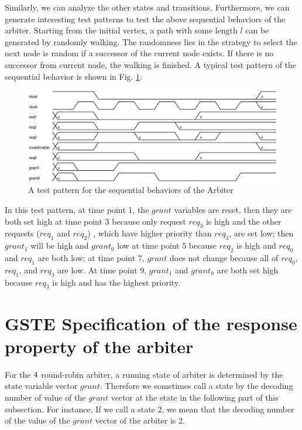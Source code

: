 \documentclass[final]{IEEEtran}
\begin{document}
Similarly, we can analyze the other states and transitions.
Furthermore, we can generate interesting test patterns to test the
above sequential behaviors of the arbiter. Starting from the initial
vertex, a path with some length $l$ can be generated by randomly
walking. The randomness lies in the strategy to select the next node
is random if a successor of the current node exists. If there is no
successor from current node, the walking is finished. A typical test
pattern of the sequential behavior is shown in Fig.
\ref{fig:TestPatternForSeq}:

\begin{figure}[tbph]
\begin{center}
\includegraphics[width=.5\textwidth]{TestPatternForSeq.eps}
\end{center}
\caption{A test pattern for the sequential behaviors of the Arbiter}
\label{fig:TestPatternForSeq}
\end{figure}

In this test pattern, at time point 1, the $grant$ variables are
reset, then they are both set high at time point 3 because only
request $req_3$ is high and the other requests ($req_1$ and $req_2$)
, which have higher priority than $req_3$, are set low; then
$grant_1$ will be high and $grant_0$ low at time point 5 because
$req_2$ is high and $req_0$ and $req_1$ are both low; at time point
7, $grant$ does not change because all of $req_0$, $req_1$, and
$req_3$ are low. At time point 9, $grant_1$ and $grant_0$ are both
set high because $req_3$ is high  and has the highest priority.

\section{GSTE Specification of the response property of the
arbiter}\label{secLiveness}



 For the $4\time 4$ round-robin arbiter, a running state of arbiter is
 determined  by the state variable vector $grant$. Therefore we
 sometimes call
 a state by   the decoding number of value of the $grant$ vector %
at the state in the following part of this subsection. For instance,
If  we call a state 2, we mean that the decoding number of the value
of the $grant$ vector of the arbiter is 2.
\end{document}
